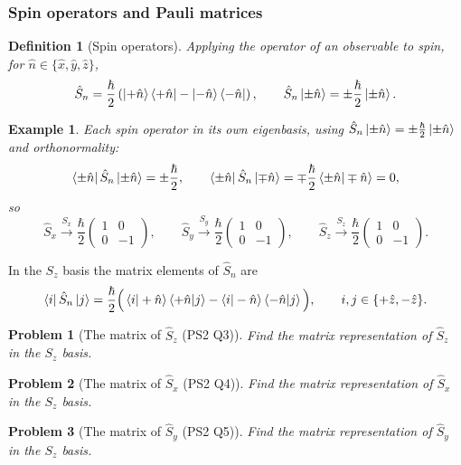 \documentclass{article}
\newtheorem{definition}{Definition}
\newtheorem{problem}{Problem}
\newtheorem*{example}{Example}
\begin{document}
\subsubsection{Spin operators and Pauli matrices}
\begin{definition}[Spin operators]
    Applying the operator of an observable to spin, for $\hat{n} \in \{\hat{x},\hat{y},\hat{z}\}$,
    \begin{equation}
        \hat{S}_n = \frac{\hbar}{2}\left(\ket{+\hat{n}}\bra{+\hat{n}} - \ket{-\hat{n}}\bra{-\hat{n}}\right), \qquad \hat{S}_n\ket{\pm\hat{n}} = \pm\frac{\hbar}{2}\ket{\pm\hat{n}}.
    \end{equation}
\end{definition}
\begin{example}
    Each spin operator in its own eigenbasis, using $\hat{S}_n\ket{\pm\hat{n}} = \pm\frac{\hbar}{2}\ket{\pm\hat{n}}$ and orthonormality:
    \[\bra{\pm\hat{n}}\hat{S}_n\ket{\pm\hat{n}} = \pm\frac{\hbar}{2}, \qquad \bra{\pm\hat{n}}\hat{S}_n\ket{\mp\hat{n}} = \mp\frac{\hbar}{2}\braket{\pm\hat{n}|\mp\hat{n}} = 0,\]
    so
    \[\hat{S}_x \xrightarrow{S_x} \frac{\hbar}{2}\begin{pmatrix} 1 & 0 \\ 0 & -1 \end{pmatrix}, \qquad
    \hat{S}_y \xrightarrow{S_y} \frac{\hbar}{2}\begin{pmatrix} 1 & 0 \\ 0 & -1 \end{pmatrix}, \qquad
    \hat{S}_z \xrightarrow{S_z} \frac{\hbar}{2}\begin{pmatrix} 1 & 0 \\ 0 & -1 \end{pmatrix}.\]
\end{example}
In the $S_z$ basis the matrix elements of $\hat{S}_n$ are
\[\bra{i}\hat{S}_n\ket{j} = \frac{\hbar}{2}\Big(\braket{i|+\hat{n}}\braket{+\hat{n}|j} - \braket{i|-\hat{n}}\braket{-\hat{n}|j}\Big), \qquad i,j \in \{+\hat{z},-\hat{z}\}.\]
\begin{problem}[The matrix of $\hat{S}_z$ (PS2 Q3)]
    Find the matrix representation of $\hat{S}_z$ in the $S_z$ basis.
\end{problem}
\begin{problem}[The matrix of $\hat{S}_x$ (PS2 Q4)]
    Find the matrix representation of $\hat{S}_x$ in the $S_z$ basis.
\end{problem}
\begin{problem}[The matrix of $\hat{S}_y$ (PS2 Q5)]
    Find the matrix representation of $\hat{S}_y$ in the $S_z$ basis.
\end{problem}
\end{document}
